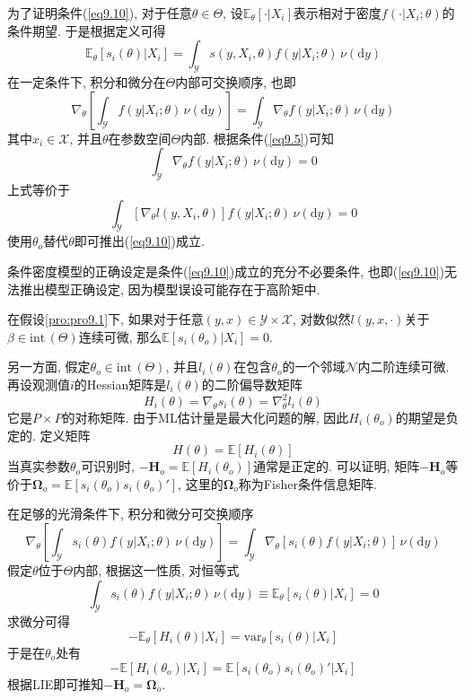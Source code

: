 \documentclass[cn, 12pt, math=mtpro2, bibstyle=apa, blue, twocol]{elegantbook}
\newcommand{\E}{\mathbb{E}}
\newcommand{\var}{\text{var}}
\newcommand{\BO}{\mathbold{\Omega}}
\begin{document}
为了证明条件(\ref{eq9.10}), 对于任意$\theta\in\Theta$, 设$\E_\theta[\cdot|X_i]$表示相对于密度$f(\cdot|X_i;\theta)$的条件期望. 于是根据定义可得
$$\E_\theta[s_i(\theta)|X_i]=\int_\mathscr{Y}s(y,X_i,\theta)f(y|X_i;\theta)\,\nu(\text{d}y)$$
在一定条件下, 积分和微分在$\Theta$内部可交换顺序, 也即
\begin{equation}\label{eq9.11}
  \nabla_\theta\left[\int_{\mathscr{Y}}f(y|X_i;\theta)\,\nu(\text{d}y)\right]=\int_\mathscr{Y}\nabla_\theta f(y|X_i;\theta)\,\nu(\text{d}y)
\end{equation}
其中$x_i\in\mathscr{X}$, 并且$\theta$在参数空间$\Theta$内部. 根据条件(\ref{eq9.5})可知
$$\int_\mathscr{Y}\nabla_\theta f(y|X_i;\theta)\,\nu(\text{d}y)=0$$
上式等价于
$$\int_\mathscr{Y}[\nabla_\theta l(y,X_i,\theta)]f(y|X_i;\theta)\,\nu(\text{d}y)=0$$
使用$\theta_o$替代$\theta$即可推出(\ref{eq9.10})成立.

\begin{remark}
条件密度模型的正确设定是条件(\ref{eq9.10})成立的充分不必要条件, 也即(\ref{eq9.10})无法推出模型正确设定, 因为模型误设可能存在于高阶矩中.
\end{remark}

\begin{theorem}\label{thm:thm9.1}
  在假设\ref{pro:pro9.1}下, 如果对于任意$(y,x)\in\mathscr{Y}\times \mathscr{X}$, 对数似然$l(y,x,\cdot)$关于$\beta\in\text{int}\,(\Theta)$连续可微, 那么$\E[s_i(\theta_o)|X_i]=0$.
\end{theorem}

另一方面, 假定$\theta_o\in\text{int}\,(\Theta)$, 并且$l_i(\theta)$在包含$\theta_o$的一个邻域$\mathscr{N}$内二阶连续可微. 再设观测值$i$的Hessian矩阵是$ l_i(\theta)$的二阶偏导数矩阵
$$H_i(\theta)=\nabla_\theta s_i(\theta)=\nabla_\theta^2  l_i(\theta)$$
它是$P\times P$的对称矩阵. 由于ML估计量是最大化问题的解, 因此$H_i(\theta_o)$的期望是负定的. 定义矩阵
$$H(\theta)=\E[H_i(\theta)]$$
当真实参数$\theta_o$可识别时, $-\mathbold{H}_o=\E[H_i(\theta_o)]$通常是正定的. 可以证明, 矩阵$-\mathbold{H}_o$等价于$\BO_o=\E[s_i(\theta_o)s_i(\theta_o)']$, 这里的$\BO_o$称为Fisher条件信息矩阵.

在足够的光滑条件下, 积分和微分可交换顺序
\begin{equation}\label{eq9.12}
  \nabla_\theta\left[\int_\mathscr{Y}s_i(\theta)f(y|X_i;\theta)\,\nu(\text{d}y)\right]=\int_\mathscr{Y}\nabla_\theta[s_i(\theta)f(y|X_i;\theta)]\,\nu(\text{d}y)
\end{equation}
假定$\theta$位于$\Theta$内部, 根据这一性质, 对恒等式
$$\int_\mathscr{Y}s_i(\theta)f(y|X_i;\theta)\,\nu(\text{d}y)\equiv \E_\theta[s_i(\theta)|X_i]=0$$
求微分可得
$$-\E_\theta[H_i(\theta)|X_i]=\var_\theta[s_i(\theta)|X_i]$$
于是在$\theta_o$处有
$$-\E[H_i(\theta_o)|X_i]=\E[s_i(\theta_o)s_i(\theta_o)'|X_i]$$
根据LIE即可推知$-\mathbold{H}_o=\BO_o$.
\end{document}
